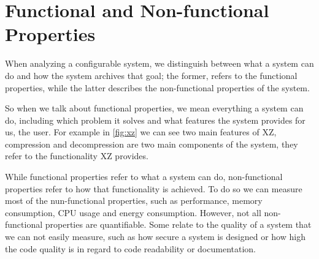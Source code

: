\section{Functional and Non-functional Properties}\label{ch:properties}

When analyzing a configurable system, we distinguish between what a system can do and how the system archives that goal; the former,
refers to the functional properties, while the latter describes the non-functional properties of the system. \cite{non-functional-Properties}

So when we talk about functional properties, we mean everything a system can do, including which problem it solves and what
features the system provides for us, the user. 
For example in \autoref{fig:xz} we can see two main features of XZ, compression and decompression are two main components of the system,
they refer to the functionality XZ provides.

While functional properties refer to what a system can do, non-functional properties refer to how that functionality is achieved. 
To do so we can measure most of the nun-functional properties, such as performance, memory consumption, CPU usage and energy consumption. 
However, not all non-functional properties are quantifiable. Some relate to the quality of a system that we can not easily measure, such as
how secure a system is designed or how high the code quality is in regard to code readability or documentation. \cite{non-functional-Properties}
